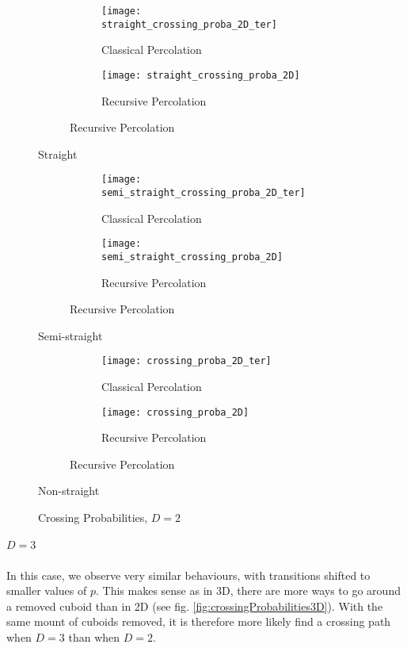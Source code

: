 \begin{figure}[!h]
	\centering
	\begin{subfigure}{\textwidth}
		\begin{subfigure}{.49\textwidth}
			\texttt{[image: straight\_crossing\_proba\_2D\_ter]}
			\centering
			\caption{Classical Percolation}
			\label{fig:crossingProbabilityClassical}
		\end{subfigure}
		\begin{subfigure}{.49\textwidth}
			\texttt{[image: straight\_crossing\_proba\_2D]}
			\centering
			\caption{Recursive Percolation}
			\label{fig:crossingProbabilityRecursive}
		\end{subfigure}
	\end{subfigure}
	Straight
	
	\vspace{0.5cm}
	\begin{subfigure}{\textwidth}
		\begin{subfigure}{.49\textwidth}
			\texttt{[image: semi\_straight\_crossing\_proba\_2D\_ter]}
			\centering
			\caption{Classical Percolation}
		\end{subfigure}
		\begin{subfigure}{.49\textwidth}
			\texttt{[image: semi\_straight\_crossing\_proba\_2D]}
			\centering
			\caption{Recursive Percolation}
		\end{subfigure}
	\end{subfigure}
	Semi-straight
	
	\vspace{0.5cm}
	\begin{subfigure}{\textwidth}
		\begin{subfigure}{.49\textwidth}
			\texttt{[image: crossing\_proba\_2D\_ter]}
			\centering
			\caption{Classical Percolation}
		\end{subfigure}
		\begin{subfigure}{.49\textwidth}
			\texttt{[image: crossing\_proba\_2D]}
			\centering
			\caption{Recursive Percolation}
		\end{subfigure}
	\end{subfigure}
	Non-straight
	
	\vspace{0.25cm}
	\caption{Crossing Probabilities, $D=2$}
	\label{fig:crossingProbabilities2D}
\end{figure}

\subparagraph{$D=3$}
In this case, we observe very similar behaviours, with transitions shifted to smaller values of $p$.
This makes sense as in 3D, there are more ways to go around a removed cuboid than in 2D (see fig. \ref{fig:crossingProbabilities3D}).
With the same mount of cuboids removed, it is therefore more likely find a crossing path when $D=3$ than when $D=2$.

